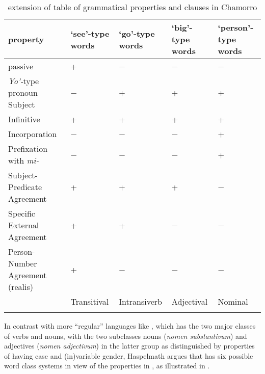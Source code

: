 \documentclass[output=paper]{langsci/langscibook}
\begin{document}
\begin{table}
\centering
{\small
\begin{tabularx}{\textwidth}{lXXXX}
\lsptoprule
property                        & ‘see’-type words & ‘go’-type words & ‘big’-type words & ‘person’-type words\\
\midrule
passive                         & +                & −               & −                & −\\
\emph{Yo’-}type pronoun Subject & −                & +               & +                & +\\
Infinitive                      & +                & +               & +                & +\\
Incorporation                   & −                & −               & −                & +\\
Prefixation with \emph{mi-}     & −                & −               & −                & +\\
Subject-Predicate Agreement     & +                & +               & +                & −\\
Specific External Agreement     & +                & +               & −                & −\\
Person-Number Agreement (realis) & +                & −               & −                & −\\
                                & Transitival                     & Intransiverb     & Adjectival      & Nominal\\
\lspbottomrule
\end{tabularx}
}
\caption{ extension of  table of
\mbox{grammatical} properties and clauses in Chamorro}\label{tab:key:27.1}
\end{table}

In contrast with more \enquote{regular} languages like , which has
the two major classes of verbs and nouns, with the two subclasses nouns
(\emph{nomen substantivum}) and adjectives (\emph{nomen adjectivum}) in the
latter group as distinguished by properties of having case and (in)variable
gender, Haspelmath argues that  has six possible word class
systems in view of the properties in , as illustrated in
.
\end{document}
